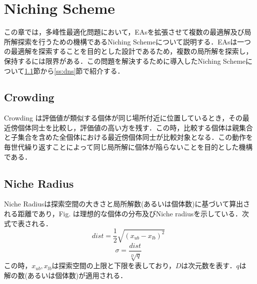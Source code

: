 \documentclass[a4j,11pt]{jarticle}
\begin{document}
\newpage
\section{Niching Scheme}
\label{sec:ns}
この章では，多峰性最適化問題において，EAsを拡張させて複数の最適解及び局所解探索を行うための機構であるNiching Schemeについて説明する．EAsは一つの最適解を探索することを目的とした設計であるため，複数の局所解を探索し，保持するには限界がある．この問題を解決するために導入したNiching Schemeについて\ref{ss:Crowding}節から\ref{ss:dns}節で紹介する．

\subsection{Crowding}
\label{ss:Crowding}
Crowding \cite{Crowding} は評価値が類似する個体が同じ場所付近に位置しているとき，その最近傍個体同士を比較し，評価値の高い方を残す．この時，比較する個体は親集合と子集合を含めた全個体における最近傍個体同士が比較対象となる．この動作を毎世代繰り返すことによって同じ局所解に個体が陥らないことを目的とした機構である．

\subsection{Niche Radius}
\label{ss:nr}
Niche Radiusは探索空間の大きさと局所解数(あるいは個体数)に基づいて算出される距離であり，Fig. は理想的な個体の分布及びNiche radiusを示している．次式で表される．
\begin{equation}
\label{eq:nr-d}
dist=\frac{1}{2}\sqrt{(x_{ub}-x_{lb})^2}
\end{equation}
\begin{equation}
\label{eq:nr-s}
\sigma=\frac{dist}{\sqrt[D]{q}}
\end{equation}
この時，$x_{ub},x_{lb}$は探索空間の上限と下限を表しており，$D$は次元数を表す．$q$は解の数(あるいは個体数)が適用される．
\end{document}
